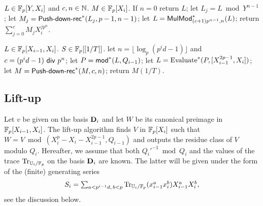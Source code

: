 \begin{algorithm}
  \caption{$\dual{\alg{\text{Push-down-rec}}}$}
  \begin{algorithmic}[1]
    \REQUIRE $L\in\mathbb{F}_p[Y,X_i]$ and $c,n\in\mathbb{N}$.
    \ENSURE $M\in \mathbb{F}_p[X_i]$.
    \STATE If $n=0$ return $L$;
    \STATE let $L_j = L \bmod Y^{n-1}$;
    \STATE let $M_j=\text{\sf Push-down-rec}^\ast(L_j,p-1,n-1)$;
    \STATE let $L = {\sf MulMod}_{(c+1)p^{n-1},n}^\ast(L)$;
    \ENDFOR
    \STATE return $\sum_{j=0}^{c} M_j X_i^{jp^n}$.
  \end{algorithmic}
\end{algorithm}

\begin{algorithm}
  \caption{$\dual{\alg{\text{Push-down}}}$}
  \begin{algorithmic}[1]
    \REQUIRE $L\in \mathbb{F}_p[X_{i-1},X_i]$.
    \ENSURE $S \in \mathbb{F}_p[[1/T]]$.
    \STATE let $n=\lfloor \log_p(p^id-1) \rfloor$ and $c=(p^id-1) {\sf~div~} p^n$;
    \STATE let $P={\sf mod}^\ast(L,Q_{i-1})$;
    \STATE let $L = \text{Evaluate}^\ast(P,[X_{i-1}^{2p-1},X_i])$;
    \STATE let $M = \text{{\sf Push-down-rec}}^\ast(M,c,n)$;
    \STATE return $M(1/T)$.
  \end{algorithmic}
\end{algorithm}




\subsection{Lift-up}
\label{sec:level-embedding:lift-up}

Let $v$ be given on the basis $\mathbf{D}_i$ and let $W$ be its
canonical preimage in $\mathbb{F}_p[X_{i-1},X_i]$.  The lift-up algorithm
finds $V$ in $\mathbb{F}_p[X_i]$ such that $W=V \bmod
(X_i^p-X_i-X_{i-1}^{2p-1},Q_{i-1})$ and outputs the residue class of
$V$ modulo $Q_i$. Hereafter, we assume that both $Q_i'^{-1} \bmod Q_i$
and the values of the trace $\operatorname{Tr}_{\mathbb{U}_i/\mathbb{F}_p}$ on the basis
$\mathbf{D}_i$ are known.  The latter will be given under the form of
the (finite) generating series
$$\begin{array}{c}
  S_i=\sum_{a < p^{i-1}d,\, b < p} \operatorname{Tr}_{\mathbb{U}_i/\mathbb{F}_p}(x_{i-1}^ax_i^b)X_{i-1}^a X_i^b,
\end{array}
$$ 
see the discussion below.

